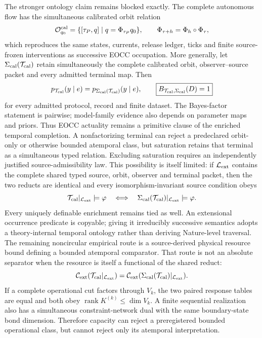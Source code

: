 \documentclass[11pt]{article}
\begin{document}
The stronger ontology claim remains blocked exactly.  The complete autonomous
flow has the simultaneous calibrated orbit relation
\begin{equation}
 \mathcal O_{q_0}^{\rm cal}
 =\{[\tau_P,q]\mid q=\Phi_{\tau_P}q_0\},
 \qquad \Phi_{\tau+h}=\Phi_h\circ\Phi_\tau,
 \label{eq:synthesis-calibrated-orbit}
\end{equation}
which reproduces the same states, currents, release ledger, ticks and finite
source-frozen interventions as successive EOCC occupation.  More generally,
let \(\Sigma_{\rm cal}(\mathcal T_{\rm cal})\) retain simultaneously the
complete calibrated orbit, observer--source packet and every admitted
terminal map.  Then
\begin{equation}
 p_{\mathcal T_{\rm cal}}(y\mid e)
 =p_{\Sigma_{\rm cal}(\mathcal T_{\rm cal})}(y\mid e),
 \qquad
 \boxed{B_{\mathcal T_{\rm cal},\Sigma_{\rm cal}}(D)=1}
 \label{eq:synthesis-saturation-bayes-ceiling}
\end{equation}
for every admitted protocol, record and finite dataset.  The Bayes-factor
statement is pairwise; model-family evidence also depends on parameter maps
and priors.  Thus EOCC actuality remains a primitive clause of the enriched
temporal completion.  A nonfactorizing terminal can reject a predeclared
orbit-only or otherwise bounded atemporal class, but saturation retains that
terminal as a simultaneous typed relation.  Excluding saturation requires an
independently justified source-admissibility law.  This possibility is itself
limited: if \(\mathcal L_{\rm ext}\) contains the complete shared typed source,
orbit, observer and terminal packet, then the two reducts are identical and
every isomorphism-invariant source condition obeys
\begin{equation}
 \mathcal T_{\rm cal}|_{\mathcal L_{\rm ext}}\models\varphi
 \quad\Longleftrightarrow\quad
 \Sigma_{\rm cal}(\mathcal T_{\rm cal})|_{\mathcal L_{\rm ext}}
 \models\varphi.
 \label{eq:synthesis-extensional-source-no-go}
\end{equation}
Every uniquely definable enrichment remains tied as well.  An extensional
occurrence predicate is copyable; giving it irreducibly successive semantics
adopts a theory-internal temporal ontology rather than deriving Nature-level
traversal.  The remaining noncircular empirical route is a source-derived
physical resource bound defining a bounded atemporal comparator.
That route is not an absolute separator when the resource is itself a
functional of the shared reduct:
\begin{equation}
 \mathcal C_{\rm ext}(\mathcal T_{\rm cal}|_{\mathcal L_{\rm ext}})
 =
 \mathcal C_{\rm ext}(
 \Sigma_{\rm cal}(\mathcal T_{\rm cal})|_{\mathcal L_{\rm ext}}).
 \label{eq:synthesis-capacity-saturation-no-go}
\end{equation}
If a complete operational cut factors through \(V_k\), the two paired
response tables are equal and both obey
\(\operatorname{rank}K^{(k)}\leq\dim V_k\).  A finite sequential realization
also has a simultaneous constraint-network dual with the same boundary-state
bond dimension.  Therefore capacity can reject a preregistered bounded
operational class, but cannot reject only its atemporal interpretation.
\end{document}

